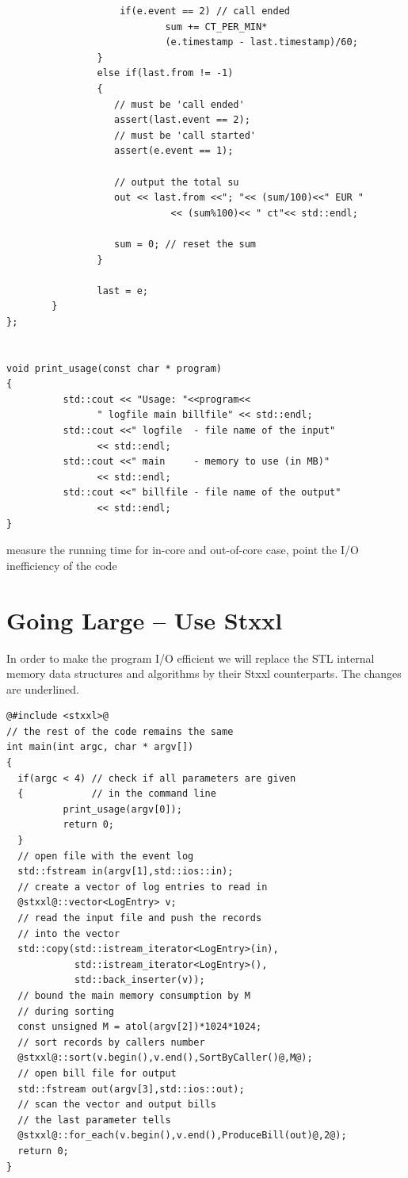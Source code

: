 \documentclass[twoside]{book}
\newcommand{\stxxl}{{\sc Stxxl} }
\begin{document}
\begin{lstlisting}
                    if(e.event == 2) // call ended
                            sum += CT_PER_MIN*
                            (e.timestamp - last.timestamp)/60;
                }
                else if(last.from != -1)
                {
                   // must be 'call ended'
                   assert(last.event == 2);
                   // must be 'call started'
                   assert(e.event == 1);
                        
                   // output the total su
                   out << last.from <<"; "<< (sum/100)<<" EUR "
                             << (sum%100)<< " ct"<< std::endl;
                        
                   sum = 0; // reset the sum
                }
                        
                last = e;
        }
};


void print_usage(const char * program)
{
          std::cout << "Usage: "<<program<<
                " logfile main billfile" << std::endl;
          std::cout <<" logfile  - file name of the input"
                << std::endl;
          std::cout <<" main     - memory to use (in MB)"
                << std::endl;
          std::cout <<" billfile - file name of the output"
                << std::endl;
}

\end{lstlisting}

measure the running time for in-core and out-of-core case,
point the I/O inefficiency of the code

\section{Going Large -- Use \stxxl}
In order to make the program I/O efficient we will replace the STL
internal memory data structures and algorithms by their \stxxl
counterparts. The changes are underlined.

\begin{lstlisting}
@#include <stxxl>@
// the rest of the code remains the same
int main(int argc, char * argv[])
{
  if(argc < 4) // check if all parameters are given 
  {            // in the command line
          print_usage(argv[0]);
          return 0;
  }
  // open file with the event log
  std::fstream in(argv[1],std::ios::in);
  // create a vector of log entries to read in
  @stxxl@::vector<LogEntry> v;
  // read the input file and push the records
  // into the vector
  std::copy(std::istream_iterator<LogEntry>(in),
            std::istream_iterator<LogEntry>(),
            std::back_inserter(v));
  // bound the main memory consumption by M 
  // during sorting
  const unsigned M = atol(argv[2])*1024*1024;
  // sort records by callers number
  @stxxl@::sort(v.begin(),v.end(),SortByCaller()@,M@);
  // open bill file for output
  std::fstream out(argv[3],std::ios::out);
  // scan the vector and output bills
  // the last parameter tells
  @stxxl@::for_each(v.begin(),v.end(),ProduceBill(out)@,2@);
  return 0;
}
\end{lstlisting}
\end{document}
